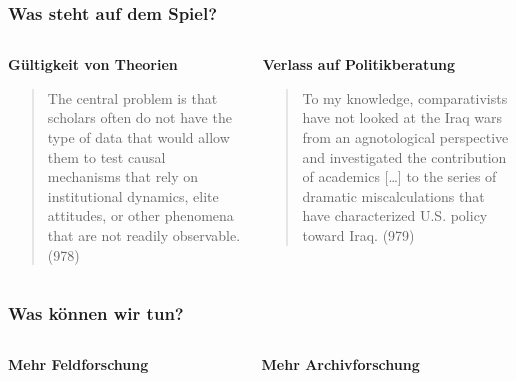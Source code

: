 \documentclass{beamer}
\begin{document}
\begin{frame}
  \frametitle{Was steht auf dem Spiel?}
  \begin{columns}[t]
    \begin{column}{.5\textwidth}
      \textbf{Gültigkeit von Theorien}
      \begin{quote}
        \small
        The central problem is that scholars often do not have
        the type of data that would allow them to test causal
        mechanisms that rely on institutional dynamics, elite
        attitudes, or other phenomena that are not readily
        observable. (978)
      \end{quote}
    \end{column}
    \begin{column}{.5\textwidth}
      \textbf{Verlass auf Politikberatung}
      \begin{quote}
        \small
        To my knowledge, comparativists have not looked at the
        Iraq wars from an agnotological perspective and
        investigated the contribution of academics [\dots]
        to the series of dramatic miscalculations that have
        characterized U.S. policy toward Iraq. (979)
      \end{quote}
    \end{column}
  \end{columns}
\end{frame}

\begin{frame}
  \frametitle{Was können wir tun?}
  \begin{columns}
    \begin{column}{.5\textwidth}
      \textbf{Mehr Feldforschung}
    \end{column}
    \begin{column}{.5\textwidth}
      \textbf{Mehr Archivforschung}
    \end{column}
  \end{columns}
\end{frame}
\end{document}
